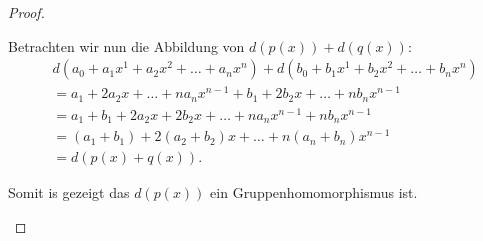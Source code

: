 \documentclass{../problemset}
\begin{document}
\begin{problem}
\begin{proof}
\begin{enumerate}
		      Betrachten wir nun die Abbildung von $d(p(x)) + d(q(x))$: \begin{align}
			       & d(a_0 + a_1x^1 + a_2x^2 + \ldots + a_nx^n) + d(b_0 + b_1x^1 + b_2x^2 + \ldots + b_nx^n) \\
			       & = a_1 + 2a_2x + \ldots + na_nx^{n-1} + b_1 + 2b_2x + \ldots + nb_nx^{n-1}               \\
			       & = a_1 + b_1 + 2a_2x + 2b_2x + \ldots + na_nx^{n-1} + nb_nx^{n-1}                        \\
			       & = (a_1 + b_1) + 2(a_2 + b_2)x + \ldots + n(a_n+b_n)x^{n-1}                              \\
			       & = d(p(x) + q(x)).
		      \end{align}

		      Somit is gezeigt das $d(p(x))$ ein Gruppenhomomorphismus ist.
		      \checkmark


\end{enumerate}
\end{proof}
\end{problem}
\end{document}
